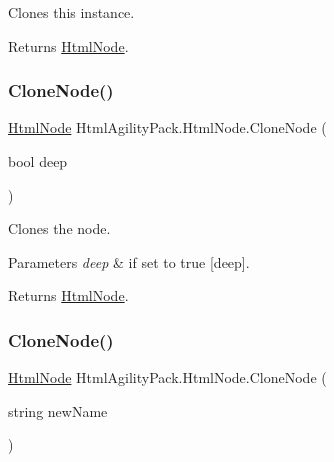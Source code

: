 Clones this instance. 

\begin{DoxyReturn}{Returns}
\hyperlink{class_html_agility_pack_1_1_html_node}{Html\+Node}.
\end{DoxyReturn}
\mbox{\label{class_html_agility_pack_1_1_html_node_a9fc88469da53a2bef92ac1d829dd8068}} 
\subsubsection{\texorpdfstring{Clone\+Node()}{CloneNode()}\hspace{0.1cm}{\footnotesize\ttfamily [1/3]}}
{\footnotesize\ttfamily \hyperlink{class_html_agility_pack_1_1_html_node}{Html\+Node} Html\+Agility\+Pack.\+Html\+Node.\+Clone\+Node (\begin{DoxyParamCaption}\item[{bool}]{deep }\end{DoxyParamCaption})\hspace{0.3cm}{\ttfamily [inline]}}



Clones the node. 


\begin{DoxyParams}{Parameters}
{\em deep} & if set to {\ttfamily true} \mbox{[}deep\mbox{]}.\\
\hline
\end{DoxyParams}
\begin{DoxyReturn}{Returns}
\hyperlink{class_html_agility_pack_1_1_html_node}{Html\+Node}.
\end{DoxyReturn}
\mbox{\label{class_html_agility_pack_1_1_html_node_a0c0dac08627e56110b4121435378b307}} 
\subsubsection{\texorpdfstring{Clone\+Node()}{CloneNode()}\hspace{0.1cm}{\footnotesize\ttfamily [2/3]}}
{\footnotesize\ttfamily \hyperlink{class_html_agility_pack_1_1_html_node}{Html\+Node} Html\+Agility\+Pack.\+Html\+Node.\+Clone\+Node (\begin{DoxyParamCaption}\item[{string}]{new\+Name }\end{DoxyParamCaption})\hspace{0.3cm}{\ttfamily [inline]}}



